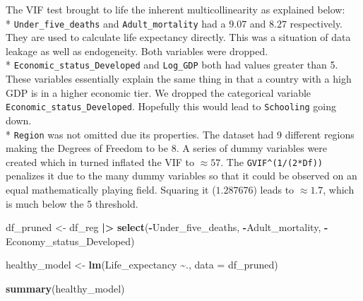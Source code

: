 \documentclass[
  10pt,
]{article}
\newenvironment{Shaded}{\begin{snugshade}}{\end{snugshade}}
\newcommand{\AttributeTok}[1]{\textcolor[rgb]{0.13,0.29,0.53}{#1}}
\newcommand{\FunctionTok}[1]{\textcolor[rgb]{0.13,0.29,0.53}{\textbf{#1}}}
\newcommand{\NormalTok}[1]{#1}
\newcommand{\OtherTok}[1]{\textcolor[rgb]{0.56,0.35,0.01}{#1}}
\newcommand{\SpecialCharTok}[1]{\textcolor[rgb]{0.81,0.36,0.00}{\textbf{#1}}}
\begin{document}
The VIF test brought to life the inherent multicollinearity as explained
below:\\
* \texttt{Under\_five\_deaths} and \texttt{Adult\_mortality} had a
\(9.07\) and \(8.27\) respectively. They are used to calculate life
expectancy directly. This was a situation of data leakage as well as
endogeneity. Both variables were dropped.\\
* \texttt{Economic\_status\_Developed} and \texttt{Log\_GDP} both had
values greater than 5. These variables essentially explain the same
thing in that a country with a high GDP is in a higher economic tier. We
dropped the categorical variable \texttt{Economic\_status\_Developed}.
Hopefully this would lead to \texttt{Schooling} going down.\\
* \texttt{Region} was not omitted due its properties. The dataset had 9
different regions making the Degrees of Freedom to be 8. A series of
dummy variables were created which in turned inflated the VIF to
\(\approx 57\). The \texttt{GVIF\^{}(1/(2*Df))} penalizes it due to the
many dummy variables so that it could be observed on an equal
mathematically playing field. Squaring it (\(1.287676\)) leads to
\(\approx 1.7\), which is much below the 5 threshold.\\

\begin{Shaded}
\begin{Highlighting}[]
\NormalTok{df\_pruned }\OtherTok{\textless{}{-}}\NormalTok{ df\_reg }\SpecialCharTok{|\textgreater{}}
  \FunctionTok{select}\NormalTok{(}\SpecialCharTok{{-}}\NormalTok{Under\_five\_deaths, }\SpecialCharTok{{-}}\NormalTok{Adult\_mortality, }\SpecialCharTok{{-}}\NormalTok{Economy\_status\_Developed)}

\NormalTok{healthy\_model }\OtherTok{\textless{}{-}} \FunctionTok{lm}\NormalTok{(Life\_expectancy }\SpecialCharTok{\textasciitilde{}}\NormalTok{., }\AttributeTok{data =}\NormalTok{ df\_pruned)}

\FunctionTok{summary}\NormalTok{(healthy\_model)}
\end{Highlighting}
\end{Shaded}
\end{document}
